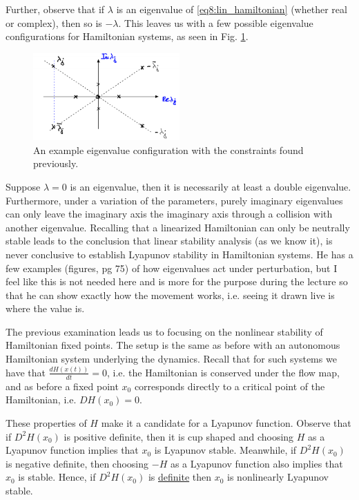 Further, observe that if $\lambda $ is an eigenvalue of \eqref{eq8:lin_hamiltonian} (whether real or complex), then so is $- \lambda $. This leaves us with a few possible eigenvalue configurations for Hamiltonian systems, as seen in Fig. \ref{fig:new_eigv_configs}.
\begin{figure}[h!]
	\centering
	\includegraphics[width=0.5\textwidth]{figures/ch8/16new_eigv_config.png}
	\caption{An example eigenvalue configuration with the constraints found previously.}
	\label{fig:new_eigv_configs}
\end{figure}

Suppose $\lambda=0$ is an eigenvalue, then it is necessarily at least a double eigenvalue. Furthermore, under a variation of the parameters, purely imaginary eigenvalues can only leave the imaginary axis the imaginary axis through a collision with another eigenvalue. 
Recalling that a linearized Hamiltonian can only be neutrally stable leads to the conclusion that linear stability analysis (as we know it), is never conclusive to establish Lyapunov stability  in Hamiltonian systems. 
{\color{blue} He has a few examples (figures, pg 75) of how eigenvalues act under perturbation, but I feel like this is not needed here and is more for the purpose during the lecture so that he can show exactly how the movement works, i.e. seeing it drawn live is where the value is.}

The previous examination leads us to focusing on the nonlinear stability of Hamiltonian fixed points. The setup is the same as before with an autonomous Hamiltonian system underlying the dynamics. Recall that for such systems we have that $\frac{dH(x(t))}{dt}=0$, i.e. the Hamiltonian is conserved under the flow map, and as before a fixed point $x_0$ corresponds directly to a critical point of the Hamiltonian, i.e. $DH(x_0)=0$.

These properties of $H$ make it a candidate for a Lyapunov function. Observe that if $D^{2}H(x_0)$ is positive definite, then it is cup shaped and choosing $H$ as a Lyapunov function implies that $x_0$ is Lyapunov stable. Meanwhile, if $D^{2}H(x_0)$ is negative definite, then choosing $-H$ as a Lyapunov function also implies that $x_0$ is stable. Hence, if $D^2H(x_0)$ is \underline{definite} then $x_0$ is nonlinearly Lyapunov stable.

